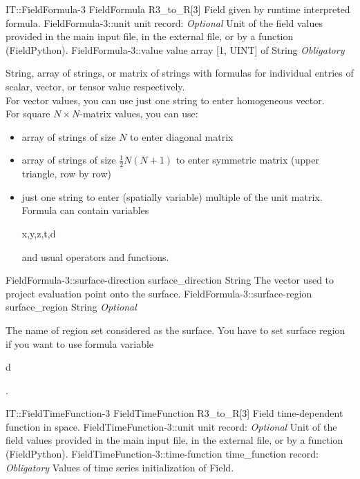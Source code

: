 \begin{RecordType}
	{IT::FieldFormula-3}
	{FieldFormula}
	{}%
	{}%
	{{{R3{\_}to{\_}R[3] Field given by runtime interpreted formula.}%
}}
		\RecKey
			{FieldFormula-3::unit}
			{unit}
			{{record: }}{}
			{ \it{Optional}}
			{{{Unit of the field values provided in the main input file, in the external file, or by a function (FieldPython).}%
}}
		\RecKey
			{FieldFormula-3::value}
			{value}
			{{array [1, UINT] of }{String}}{}
			{ \it{Obligatory}}
			{{{{String, array of strings, or matrix of strings with formulas for individual entries of scalar, vector, or tensor value respectively.}\\{
For vector values, you can use just one string to enter homogeneous vector.}\\{
For square }{$N\times N$}{-matrix values, you can use:}
% 
}
\begin{itemize}
\item {array of strings of size }{$N$}{ to enter diagonal matrix}
\item {array of strings of size }{$\frac12N(N+1)$}{ to enter symmetric matrix (upper triangle, row by row)}
\item {just one string to enter (spatially variable) multiple of the unit matrix.}\\{
Formula can contain variables }\begin{ttfamily}x,y,z,t,d\end{ttfamily}{ and usual operators and functions.}
\end{itemize}
}}
		\RecKey
			{FieldFormula-3::surface-direction}
			{surface{\_}direction}
			{{String}}{}
			{ }
			{{{The vector used to project evaluation point onto the surface.}%
}}
		\RecKey
			{FieldFormula-3::surface-region}
			{surface{\_}region}
			{{String}}{}
			{ \it{Optional}}
			{{{The name of region set considered as the surface.
You have to set surface region if you want to use formula variable }\begin{ttfamily}d\end{ttfamily}{.}%
}}
\end{RecordType}
\begin{RecordType}
	{IT::FieldTimeFunction-3}
	{FieldTimeFunction}
	{}%
	{}%
	{{{R3{\_}to{\_}R[3] Field time-dependent function in space.}%
}}
		\RecKey
			{FieldTimeFunction-3::unit}
			{unit}
			{{record: }}{}
			{ \it{Optional}}
			{{{Unit of the field values provided in the main input file, in the external file, or by a function (FieldPython).}%
}}
		\RecKey
			{FieldTimeFunction-3::time-function}
			{time{\_}function}
			{{record: }}{}
			{ \it{Obligatory}}
			{{{Values of time series initialization of Field.}%
}}
\end{RecordType}
